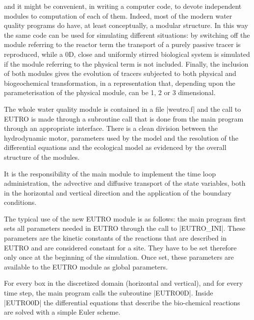 and it might be convenient, in writing a computer code, to devote 
independent modules to computation of each of them. Indeed, most 
of the modern water quality programs do have, at least conceptually, 
a modular structure. In this way the same code can be used for 
simulating different situations: by switching off the module 
referring to the reactor term the transport of a purely passive 
tracer is reproduced, while a 0D, close and uniformly stirred 
biological system is simulated if the module referring to the 
physical term is not included. Finally, the inclusion of both 
modules gives the evolution of tracers subjected to both physical 
and biogeochemical transformation, in a representation that, 
depending upon the parameterisation of the physical module, can 
be 1, 2 or 3 dimensional.

The whole water quality module is contained in a file
|weutro.f| and the call to EUTRO is made through a subroutine call
that is done from the main program through an appropriate 
interface. There is a clean division between the hydrodynamic 
motor, parameters used by the model and the resolution of the 
differential equations and the ecological model as evidenced 
by the overall structure of the modules. 

It is the responsibility of the main module to implement the 
time loop administration, the advective and diffusive transport 
of the state variables, both in the horizontal and vertical direction 
and the application of the boundary conditions. 

The typical use of the new EUTRO module is as follows: the main 
program first sets all parameters needed in EUTRO through the 
call to |EUTRO_INI|. These parameters are the kinetic constants 
of the reactions that are described in EUTRO and are considered 
constant for a site. They have to be set therefore only once 
at the beginning of the simulation. Once set, these parameters 
are available to the EUTRO module as global parameters.

For every box in the discretized domain (horizontal and vertical), 
and for every time step, the main program calls the subroutine 
|EUTRO0D|. Inside |EUTRO0D| the differential equations that describe 
the bio-chemical reactions are solved with a simple Euler scheme.

